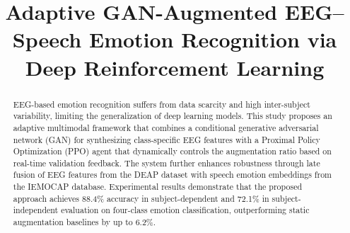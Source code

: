 \documentclass[conference]{IEEEtran}
\begin{document}
\title{Adaptive GAN-Augmented EEG--Speech Emotion Recognition via Deep Reinforcement Learning}


\author{
\and
{}
\and
{}
}


\maketitle

\begin{abstract}
EEG-based emotion recognition suffers from data scarcity and high inter-subject variability, limiting the generalization of deep learning models. This study proposes an adaptive multimodal framework that combines a conditional generative adversarial network (GAN) for synthesizing class-specific EEG features with a Proximal Policy Optimization (PPO) agent that dynamically controls the augmentation ratio based on real-time validation feedback. The system further enhances robustness through late fusion of EEG features from the DEAP dataset with speech emotion embeddings from the IEMOCAP database. Experimental results demonstrate that the proposed approach achieves 88.4\% accuracy in subject-dependent and 72.1\% in subject-independent evaluation on four-class emotion classification, outperforming static augmentation baselines by up to 6.2\%.

\end{abstract}
\end{document}
